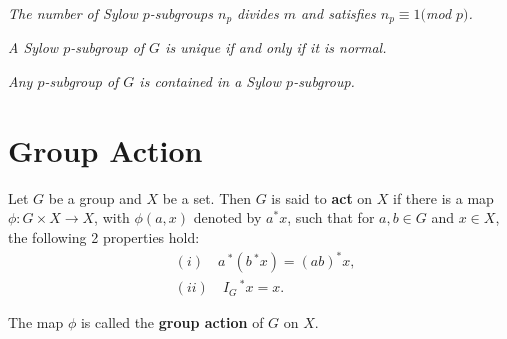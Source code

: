 \begin{3rdsylow} \textit{The number of Sylow $p$-subgroups $n_p$ divides $m$ and satisfies $n_p \equiv 1 ($mod $p)$.} \\
\end{3rdsylow}

\begin{corollary}\label{4thsylow} \textit{A Sylow $p$-subgroup of $G$ is unique if and only if it is normal.} \\
\end{corollary}

\begin{corollary}\label{5thsylow} \textit{Any $p$-subgroup of $G$ is contained in a Sylow $p$-subgroup.} \\
\end{corollary}

\section{Group Action}

\begin{definition} Let $G$ be a group and $X$ be a set. Then $G$ is said to \textbf{act} on $X$ if there is a map $\phi : G \times X \rightarrow X$, with $\phi(a,x)$ denoted by $a^*x$, such that for $a,b \in G$ and $x \in X$, the following 2 properties hold:
\begin{align*} &(i) \quad a\,^*(b\,^*x) = (ab)^*x,
\\  &(ii) \quad I_G\,^*x = x.
\end{align*}

The map $\phi$ is called the \textbf{group action} of $G$ on $X$.
\end{definition}

